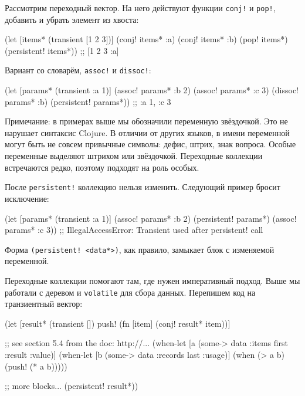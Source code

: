 Рассмотрим переходный вектор. На него действуют функции \verb|conj!| и
\verb|pop!|, добавить и убрать элемент из хвоста:

\begin{english}
  \begin{clojure}
(let [items* (transient [1 2 3])]
  (conj! items* :a)
  (conj! items* :b)
  (pop! items*)
  (persistent! items*))
;; [1 2 3 :a]
  \end{clojure}
\end{english}


\noindent
Вариант со словарём, \verb|assoc!| и \verb|dissoc!|:

\begin{english}
  \begin{clojure}
(let [params* (transient {:a 1})]
  (assoc! params* :b 2)
  (assoc! params* :c 3)
  (dissoc! params* :b)
  (persistent! params*))
;; {:a 1, :c 3}
  \end{clojure}
\end{english}

Примечание: в примерах выше мы обозначили переменную звёздочкой. Это не нарушает
синтаксис Clojure. В отличии от других языков, в имени переменной могут быть не
совсем привычные символы: дефис, штрих, знак вопроса. Особые переменные выделяют
штрихом или звёздочкой. Переходные коллекции встречаются редко, поэтому подходят
на роль особых.

После \verb|persistent!| коллекцию нельзя изменить. Следующий пример бросит
исключение:

\begin{english}
  \begin{clojure}
(let [params* (transient {:a 1})]
  (assoc! params* :b 2)
  (persistent! params*)
  (assoc! params* :c 3))
;; IllegalAccessError: Transient used after persistent! call
  \end{clojure}
\end{english}

Форма \verb|(persistent! <data*>)|, как правило, замыкает блок с изменяемой
переменной.

Переходные коллекции помогают там, где нужен императивный подход. Выше мы
работали с деревом и \verb|volatile| для сбора данных. Перепишем код на
транзиентный вектор:

\begin{english}
  \begin{clojure}
(let [result* (transient [])
      push! (fn [item]
              (conj! result* item))]

  ;; see section 5.4 from the doc: http://...
  (when-let [a (some-> data :items first :result :value)]
    (when-let [b (some-> data :records last :usage)]
      (when (> a b)
        (push! (* a b)))))

  ;; more blocks...
  (persistent! result*))
  \end{clojure}
\end{english}

